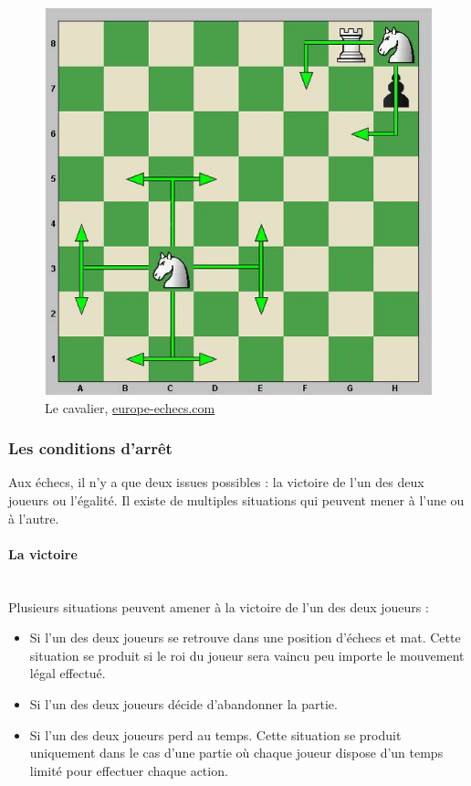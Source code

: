 \documentclass{article}
\begin{document}
\begin{figure}[h]
\centering
\includegraphics[scale=0.5]{img/mouvements_cavalier.jpg}
\caption{Le cavalier,
\href{https://www.europe-echecs.com/art/2-le-deplacement-des-pieces-93.html}{europe-echecs.com}}
\end{figure}


\subsubsection{Les conditions d'arrêt}\label{condition d'arret}

Aux échecs, il n'y a que deux issues possibles : la victoire de l'un des deux joueurs ou l'égalité. Il existe de multiples situations qui peuvent mener à l'une ou à l'autre.

\paragraph{La victoire}
~~\\

Plusieurs situations peuvent amener à la victoire de l'un des deux joueurs :
\newline

\begin{itemize}
    \item Si l'un des deux joueurs se retrouve dans une position d'échecs et mat. Cette situation se produit si le roi du joueur sera vaincu peu importe le mouvement légal effectué.
    \item Si l'un des deux joueurs décide d'abandonner la partie.
    \item Si l'un des deux joueurs perd au temps. Cette situation se produit uniquement dans le cas d'une partie où chaque joueur dispose d'un temps limité pour effectuer chaque action.
\end{itemize}
\end{document}
